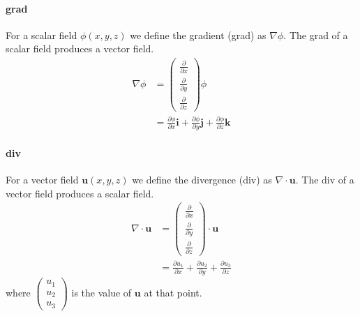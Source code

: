 \documentclass{scrartcl}
\renewcommand{\vec}[1]{\mathbf{#1}}
\begin{document}
\paragraph{grad}
For a scalar field $ \phi(x, y, z) $ we define the gradient (grad) as $ \nabla \phi $. The grad of a scalar field produces a vector field.
\begin{align}
\nabla \phi & = 
\begin{pmatrix}
\frac{\partial}{\partial x} \\[6pt]
\frac{\partial}{\partial y} \\[6pt]
\frac{\partial}{\partial z}
\end{pmatrix} \phi \\[6pt]
&= \frac{\partial \phi}{\partial x} \vec{i} + \frac{\partial \phi}{\partial y} \vec{j} + \frac{\partial \phi}{\partial z} \vec{k}
\end{align}

\paragraph{div}
For a vector field $ \vec{u}(x, y, z) $ we define the divergence (div) as $ \nabla \cdot \vec{u} $. The div of a vector field produces a scalar field.
\begin{align}
\nabla \cdot \vec{u} & = 
\begin{pmatrix}
\frac{\partial}{\partial x} \\[6pt]
\frac{\partial}{\partial y} \\[6pt]
\frac{\partial}{\partial z}
\end{pmatrix} \cdot \vec{u} \\[6pt]
& = \frac{\partial u_{1}}{\partial x} + \frac{\partial u_{2}}{\partial y} + \frac{\partial u_{3}}{\partial z}
\end{align}
where $ \begin{pmatrix}
u_{1} \\ u_{2} \\ u_{3}
\end{pmatrix} $ is the value of $ \vec{u} $ at that point.
\end{document}
